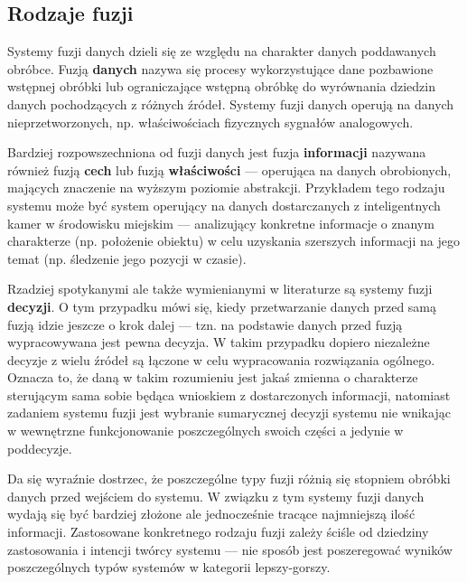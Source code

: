 \subsection{Rodzaje fuzji}
\par{
Systemy fuzji danych dzieli się ze względu na charakter danych poddawanych obróbce. Fuzją \textbf{danych} nazywa się procesy wykorzystujące dane pozbawione wstępnej obróbki lub ograniczające wstępną obróbkę do wyrównania dziedzin danych pochodzących z różnych źródeł. Systemy fuzji danych operują na danych nieprzetworzonych, np. właściwościach fizycznych sygnałów analogowych.
}
\par{
Bardziej rozpowszechniona od fuzji danych jest fuzja \textbf{informacji} nazywana również fuzją \textbf{cech} lub fuzją \textbf{właściwości} --- operująca na danych obrobionych, mających znaczenie na wyższym poziomie abstrakcji. Przykładem tego rodzaju systemu może być system operujący na danych dostarczanych z inteligentnych kamer w środowisku miejskim --- analizujący konkretne informacje o znanym charakterze (np. położenie obiektu) w celu uzyskania szerszych informacji na jego temat (np. śledzenie jego pozycji w czasie).
}
\par{
Rzadziej spotykanymi ale także wymienianymi w literaturze \cite{sroka08} są systemy fuzji \textbf{decyzji}. O tym przypadku mówi się, kiedy przetwarzanie danych przed samą fuzją idzie jeszcze o krok dalej --- tzn. na podstawie danych przed fuzją wypracowywana jest pewna decyzja. W takim przypadku dopiero niezależne decyzje z wielu źródeł są łączone w celu wypracowania rozwiązania ogólnego. Oznacza to, że daną w takim rozumieniu jest jakaś zmienna o charakterze sterującym sama sobie będąca wnioskiem z dostarczonych informacji, natomiast zadaniem systemu fuzji jest wybranie sumarycznej decyzji systemu nie wnikając w wewnętrzne funkcjonowanie poszczególnych swoich części a jedynie w poddecyzje.
}
\par{
Da się wyraźnie dostrzec, że poszczególne typy fuzji różnią się stopniem obróbki danych przed wejściem do systemu. W związku z tym systemy fuzji danych wydają się być bardziej złożone ale jednocześnie tracące najmniejszą ilość informacji. Zastosowane konkretnego rodzaju fuzji zależy ściśle od dziedziny zastosowania i intencji twórcy systemu --- nie sposób jest poszeregować wyników poszczególnych typów systemów w kategorii lepszy-gorszy.
}
